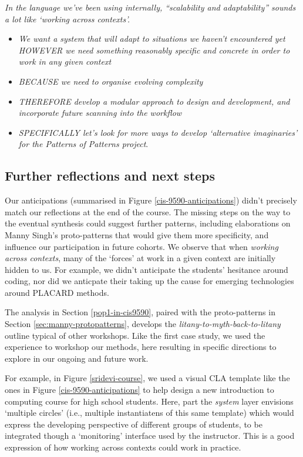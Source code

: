 \documentclass[acmlarge,timestamp]{acmart}
\begin{document}
\smallskip
\noindent \emph{In the language we’ve been using internally,
“scalability and adaptability” sounds a lot like ‘working across
contexts’.}
\begin{itemize}
  \item \emph{We want a system that will adapt to situations we haven’t encountered yet HOWEVER we need something reasonably specific and concrete in order to work in any given context}
  \item \emph{BECAUSE we need to organise evolving complexity} 
  \item \emph{THEREFORE develop a modular approach to design and development, and incorporate future scanning into the workflow}
  \item \emph{SPECIFICALLY let’s look for more ways to develop ‘alternative imaginaries’ for the Patterns of Patterns project}.
\end{itemize}

\subsection{Further reflections and next steps}\label{further-reflections}

Our anticipations (summarised in Figure \ref{cis-9590-anticipations})
didn’t precisely match our reflections at the end of the course.  The
missing steps on the way to the eventual synthesis could suggest
further patterns, including elaborations on Manny Singh’s
proto-patterns that would give them more specificity, and influence
our participation in future cohorts.  We observe that when
\emph{working across contexts}, many of the ‘forces’ at work in a
given context are initially hidden to us.  For example, we didn’t
anticipate the students’ hesitance around coding, nor did we anticpate
their taking up the cause for emerging technologies around PLACARD
methods.

The analysis in Section \ref{pop1-in-cis9590}, paired with the
proto-patterns in Section \ref{sec:manny-protopatterns}, develops the
\emph{litany-to-myth-back-to-litany} outline typical of other
workshops.  Like the first case study, we used the experience to
workshop our methods, here resulting in specific directions to explore
in our ongoing and future work.

For example, in Figure \ref{sridevi-course}, we used a visual CLA
template like the ones in Figure \ref{cis-9590-anticipations} to help
design a new introduction to computing course for high school
students.  Here, part the \emph{system} layer envisions ‘multiple
circles’ (i.e., multiple instantiatens of this same template) which
would express the developing perspective of different groups of
students, to be integrated though a ‘monitoring’ interface used by the
instructor.  This is a good expression of how working across contexts
could work in practice.
\end{document}
